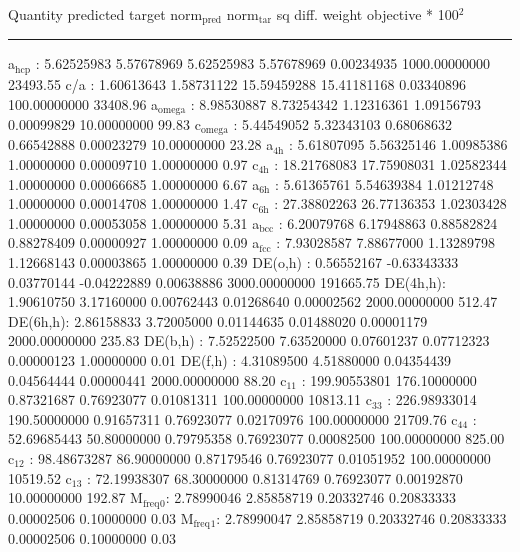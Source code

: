 \documentclass[11pt]{article}
\begin{document}
Quantity      predicted    target     norm\(_{\text{pred}}\)   norm\(_{\text{tar}}\)    sq diff.      weight    objective * 100\(^{\text{2}}\) 

\noindent\rule{\textwidth}{0.5pt}
a\(_{\text{hcp}}\)   :   5.62525983   5.57678969   5.62525983   5.57678969   0.00234935 1000.00000000     23493.55
c/a     :   1.60613643   1.58731122  15.59459288  15.41181168   0.03340896 100.00000000     33408.96
a\(_{\text{omega}}\) :   8.98530887   8.73254342   1.12316361   1.09156793   0.00099829  10.00000000        99.83
c\(_{\text{omega}}\) :   5.44549052   5.32343103   0.68068632   0.66542888   0.00023279  10.00000000        23.28
a\(_{\text{4h}}\)    :   5.61807095   5.56325146   1.00985386   1.00000000   0.00009710   1.00000000         0.97
c\(_{\text{4h}}\)    :  18.21768083  17.75908031   1.02582344   1.00000000   0.00066685   1.00000000         6.67
a\(_{\text{6h}}\)    :   5.61365761   5.54639384   1.01212748   1.00000000   0.00014708   1.00000000         1.47
c\(_{\text{6h}}\)    :  27.38802263  26.77136353   1.02303428   1.00000000   0.00053058   1.00000000         5.31
a\(_{\text{bcc}}\)   :   6.20079768   6.17948863   0.88582824   0.88278409   0.00000927   1.00000000         0.09
a\(_{\text{fcc}}\)   :   7.93028587   7.88677000   1.13289798   1.12668143   0.00003865   1.00000000         0.39
DE(o,h) :   0.56552167  -0.63343333   0.03770144  -0.04222889   0.00638886 3000.00000000    191665.75
DE(4h,h):   1.90610750   3.17160000   0.00762443   0.01268640   0.00002562 2000.00000000       512.47
DE(6h,h):   2.86158833   3.72005000   0.01144635   0.01488020   0.00001179 2000.00000000       235.83
DE(b,h) :   7.52522500   7.63520000   0.07601237   0.07712323   0.00000123   1.00000000         0.01
DE(f,h) :   4.31089500   4.51880000   0.04354439   0.04564444   0.00000441 2000.00000000        88.20
c\(_{\text{11}}\)    : 199.90553801 176.10000000   0.87321687   0.76923077   0.01081311 100.00000000     10813.11
c\(_{\text{33}}\)    : 226.98933014 190.50000000   0.91657311   0.76923077   0.02170976 100.00000000     21709.76
c\(_{\text{44}}\)    :  52.69685443  50.80000000   0.79795358   0.76923077   0.00082500 100.00000000       825.00
c\(_{\text{12}}\)    :  98.48673287  86.90000000   0.87179546   0.76923077   0.01051952 100.00000000     10519.52
c\(_{\text{13}}\)    :  72.19938307  68.30000000   0.81314769   0.76923077   0.00192870  10.00000000       192.87
M\(_{\text{freq}}\)\(_{\text{0}}\):   2.78990046   2.85858719   0.20332746   0.20833333   0.00002506   0.10000000         0.03
M\(_{\text{freq}}\)\(_{\text{1}}\):   2.78990047   2.85858719   0.20332746   0.20833333   0.00002506   0.10000000         0.03
\end{document}
